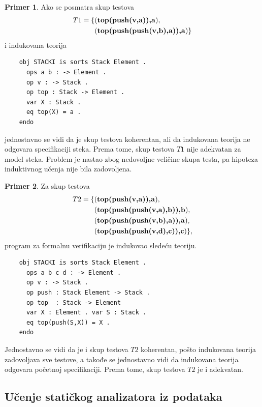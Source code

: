\documentclass[a4paper]{article}
\theoremstyle{definition}
\newtheorem{primer}{Primer}[section]
\begin{document}
{\begin{primer}
Ako se posmatra skup testova
\begin{eqnarray*}T1 = \{&(\mbox{\textbf{top(push(v,a)),a}}),\\
&(\mbox{\textbf{top(push(push(v,b),a)),a}})\}
\end{eqnarray*}
i indukovana teorija
\begin{verbatim}
	obj STACKI is sorts Stack Element .
	  ops a b : -> Element .
	  op v : -> Stack .
	  op top : Stack -> Element .
	  var X : Stack .
	  eq top(X) = a .
	endo	
\end{verbatim}
jednostavno se vidi da je skup testova koherentan, ali da indukovana teorija ne odgovara specifikaciji steka. Prema tome, skup testova $T1$ nije adekvatan za model steka. Problem je nastao zbog nedovoljne veličine skupa testa, pa hipoteza induktivnog učenja nije bila zadovoljena.
\end{primer}

\begin{primer}
Za skup testova
\begin{eqnarray*}T2 = \{&(\mbox{\textbf{top(push(v,a)),a}}),\\
&(\mbox{\textbf{top(push(push(v,a),b)),b}}),\\
&(\mbox{\textbf{top(push(push(v,b),a)),a}}),\\
&(\mbox{\textbf{top(push(push(v,d),c)),c}})\},
\end{eqnarray*}
program za formalnu verifikaciju je indukovao sledeću teoriju.
\begin{verbatim}
	obj STACKI is sorts Stack Element .
	  ops a b c d : -> Element .
	  op v : -> Stack .
	  op push : Stack Element -> Stack .
	  op top  : Stack -> Element
	  var X : Element . var S : Stack .
	  eq top(push(S,X)) = X .
	endo
\end{verbatim}
Jednostavno se vidi da je i skup testova $T2$ koherentan, pošto indukovana teorija zadovoljava sve testove, a takođe se jednostavno vidi da indukovana teorija odgovara početnoj specifikaciji. Prema tome, skup testova $T2$ je i adekvatan.
\end{primer}

\subsection{Učenje statičkog analizatora iz podataka}

}
\end{document}
